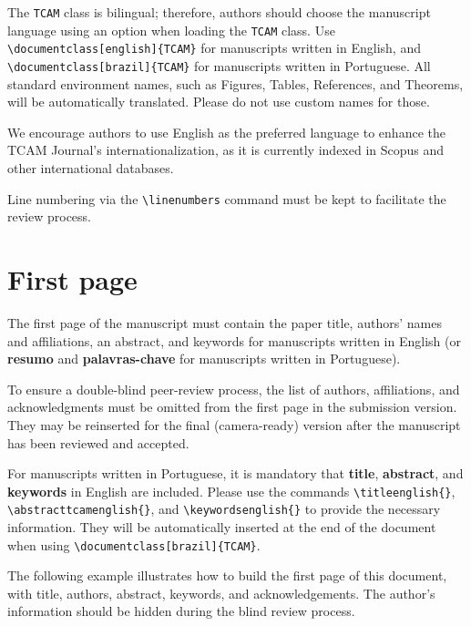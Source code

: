 \documentclass[english]{TCAM} %
\begin{document}
The \verb|TCAM| class is bilingual; therefore, authors should choose the manuscript language using an option when loading the \verb|TCAM| class. Use \verb|\documentclass[english]{TCAM}| for manuscripts written in English, and \verb|\documentclass[brazil]{TCAM}| for manuscripts written in Portuguese. All standard environment names, such as Figures, Tables, References, and Theorems, will be automatically translated. Please do not use custom names for those.

We encourage authors to use English as the preferred language to enhance the TCAM Journal's internationalization, as it is currently indexed in Scopus and other international databases.

Line numbering via the \verb|\linenumbers| command must be kept to facilitate the review process.


\section{First page}

The first page of the manuscript must contain the paper title, authors' names and affiliations, an abstract, and keywords for manuscripts written in English (or \textbf{resumo} and \textbf{palavras-chave} for manuscripts written in Portuguese).

To ensure a double-blind peer-review process, the list of authors, affiliations, and acknowledgments must be omitted from the first page in the submission version. They may be reinserted for the final (camera-ready) version after the manuscript has been reviewed and accepted.

For manuscripts written in Portuguese, it is mandatory that \textbf{title}, \textbf{abstract}, and \textbf{keywords} in English are included. Please use the commands \verb|\titleenglish{}|, \verb|\abstracttcamenglish{}|, and \verb|\keywordsenglish{}| to provide the necessary information. They will be automatically inserted at the end of the document when using \verb|\documentclass[brazil]{TCAM}|. 

The following example illustrates how to build the first page of this document, with title, authors, abstract, keywords, and acknowledgements. The author's information should be hidden during the blind review process.

\newpage
\end{document}

